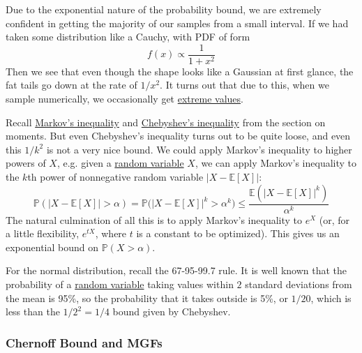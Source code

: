   Due to the exponential nature of the probability bound, we are extremely confident in getting the majority of our samples from a small interval. If we had taken some distribution like a Cauchy, with PDF of form 
  \begin{equation}
    f(x) \propto \frac{1}{1 + x^2}
  \end{equation}
  Then we see that even though the shape looks like a Gaussian at first glance, the fat tails go down at the rate of $1/x^2$. It turns out that due to this, when we sample numerically, we occasionally get \hyperref[real-thm:extreme-value-theorem]{extreme values}. 

  Recall \hyperref[thm:markovs-inequality]{Markov's inequality} and \hyperref[thm:chebyshev-inequality]{Chebyshev's inequality} from the section on moments. But even Chebyshev's inequality turns out to be quite loose, and even this $1/k^2$ is not a very nice bound. We could apply Markov's inequality to higher powers of $X$, e.g. given a \hyperref[def:random-variable]{random variable} $X$, we can apply Markov's inequality to the $k$th power of nonnegative random variable $|X - \mathbb{E}[X]|$: 
  \begin{equation}
    \mathbb{P} (|X - \mathbb{E}[X] | > \alpha) = \mathbb{P}\big( |X - \mathbb{E}[X] |^k > \alpha^k \big) \leq \frac{\mathbb{E}( |X - \mathbb{E}[X] |^k )}{\alpha^k}
  \end{equation}
  The natural culmination of all this is to apply Markov's inequality to $e^X$ (or, for a little flexibility, $e^{t X}$, where $t$ is a constant to be optimized). This gives us an exponential bound on $\mathbb{P}(X > \alpha)$. 

  \begin{example}[Gaussian]
    \label{ex:gaussian}
    For the normal distribution, recall the 67-95-99.7 rule. It is well known that the probability of a \hyperref[def:random-variable]{random variable} taking values within $2$ standard deviations from the mean is 95\%, so the probability that it takes outside is 5\%, or $1/20$, which is less than the $1/2^2 = 1/4$ bound given by Chebyshev. 
  \end{example}

  \subsubsection{Chernoff Bound and MGFs}

